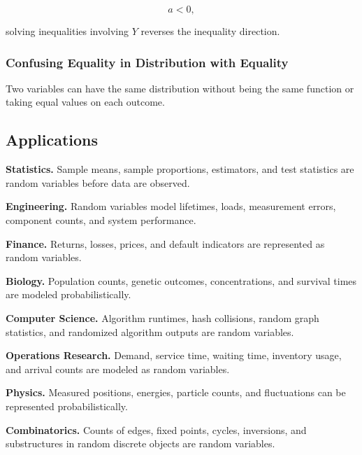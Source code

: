 \[
a<0,
\]

solving inequalities involving \(Y\) reverses the inequality direction.

\subsubsection{Confusing Equality in Distribution with Equality}

Two variables can have the same distribution without being the same
function or taking equal values on each outcome.

\subsection{Applications}
\label{subsec:random-variable-applications}

\begin{applicationbox}

\textbf{Statistics.}
Sample means, sample proportions, estimators, and test statistics are
random variables before data are observed.

\medskip

\textbf{Engineering.}
Random variables model lifetimes, loads, measurement errors, component
counts, and system performance.

\medskip

\textbf{Finance.}
Returns, losses, prices, and default indicators are represented as
random variables.

\medskip

\textbf{Biology.}
Population counts, genetic outcomes, concentrations, and survival times
are modeled probabilistically.

\medskip

\textbf{Computer Science.}
Algorithm runtimes, hash collisions, random graph statistics, and
randomized algorithm outputs are random variables.

\medskip

\textbf{Operations Research.}
Demand, service time, waiting time, inventory usage, and arrival counts
are modeled as random variables.

\medskip

\textbf{Physics.}
Measured positions, energies, particle counts, and fluctuations can be
represented probabilistically.

\medskip

\textbf{Combinatorics.}
Counts of edges, fixed points, cycles, inversions, and substructures in
random discrete objects are random variables.

\end{applicationbox}

